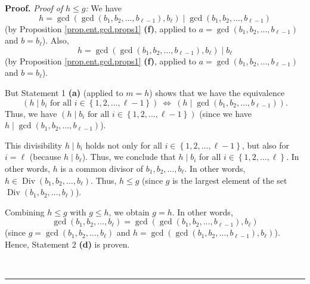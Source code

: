 \documentclass[numbers=enddot,12pt,final,onecolumn,notitlepage]{scrartcl}%
\numberwithin{exer}{subsection}
\theoremstyle{definition}
\newenvironment{proof}[1][Proof]{\noindent\textbf{#1.} }{\ \rule{0.5em}{0.5em}}
\begin{document}
\begin{proof}
\textit{Proof of }$h\leq g$\textit{:} We have%
\[
h=\gcd\left(  \gcd\left(  b_{1},b_{2},\ldots,b_{\ell-1}\right)  ,b_{\ell
}\right)  \mid\gcd\left(  b_{1},b_{2},\ldots,b_{\ell-1}\right)
\]
(by Proposition \ref{prop.ent.gcd.props1} \textbf{(f)}, applied to
$a=\gcd\left(  b_{1},b_{2},\ldots,b_{\ell-1}\right)  $ and $b=b_{\ell}$).
Also,%
\[
h=\gcd\left(  \gcd\left(  b_{1},b_{2},\ldots,b_{\ell-1}\right)  ,b_{\ell
}\right)  \mid b_{\ell}%
\]
(by Proposition \ref{prop.ent.gcd.props1} \textbf{(f)}, applied to
$a=\gcd\left(  b_{1},b_{2},\ldots,b_{\ell-1}\right)  $ and $b=b_{\ell}$).

But Statement 1 \textbf{(a)} (applied to $m=h$) shows that we have the
equivalence%
\[
\left(  h\mid b_{i}\text{ for all }i\in\left\{  1,2,\ldots,\ell-1\right\}
\right)  \ \Longleftrightarrow\ \left(  h\mid\gcd\left(  b_{1},b_{2}%
,\ldots,b_{\ell-1}\right)  \right)  .
\]
Thus, we have $\left(  h\mid b_{i}\text{ for all }i\in\left\{  1,2,\ldots
,\ell-1\right\}  \right)  $ (since we have $h\mid\gcd\left(  b_{1}%
,b_{2},\ldots,b_{\ell-1}\right)  $).

This divisibility $h\mid b_{i}$ holds not only for all $i\in\left\{
1,2,\ldots,\ell-1\right\}  $, but also for $i=\ell$ (because $h\mid b_{\ell}%
$). Thus, we conclude that $h\mid b_{i}$ for all $i\in\left\{  1,2,\ldots
,\ell\right\}  $. In other words, $h$ is a common divisor of $b_{1}%
,b_{2},\ldots,b_{\ell}$. In other words, $h\in\operatorname*{Div}\left(
b_{1},b_{2},\ldots,b_{\ell}\right)  $. Thus, $h\leq g$ (since $g$ is the
largest element of the set $\operatorname*{Div}\left(  b_{1},b_{2}%
,\ldots,b_{\ell}\right)  $).

Combining $h\leq g$ with $g\leq h$, we obtain $g=h$. In other words,
\[
\gcd\left(  b_{1},b_{2},\ldots,b_{\ell}\right)  =\gcd\left(  \gcd\left(
b_{1},b_{2},\ldots,b_{\ell-1}\right)  ,b_{\ell}\right)
\]
(since $g=\gcd\left(  b_{1},b_{2},\ldots,b_{\ell}\right)  $ and $h=\gcd\left(
\gcd\left(  b_{1},b_{2},\ldots,b_{\ell-1}\right)  ,b_{\ell}\right)  $). Hence,
Statement 2 \textbf{(d)} is proven.


\end{proof}
\end{document}
